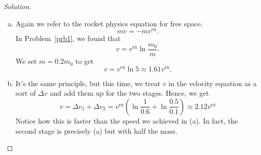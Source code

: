 \documentclass{article}
\begin{document}
\begin{proof}[Solution]
$ $
\begin{enumerate}[(a)]
\item
Again we refer to the rocket physics equation for free space.
\[ m\dot{v} = -\dot{m}v^{\textrm{ex}}. \]
In Problem~\ref{prb1}, we found that
\[ v = v^{\textrm{ex}} \ln \frac{m_0}{m}. \]
We set $m = 0.2 m_0$ to get
\[ \boxed{v = v^{\textrm{ex}} \ln 5 \approx 1.61 v^{\textrm{ex}}}. \]
\item
It's the same principle, but this time, we treat $v$ in the velocity
equation as a sort of $\Delta v$ and add them up for the two stages.
Hence, we get
\[ \boxed{v = \Delta v_1 + \Delta v_2 = v^{\textrm{ex}} \left( \ln
\frac{1}{0.6} + \ln \frac{0.5}{0.1} \right) \approx 2.12
v^{\textrm{ex}}} \]
Notice how this is faster than the speed we achieved in (a). In fact,
the second stage is precisely (a) but with half the mass.
\end{enumerate}
\end{proof}
\end{document}
